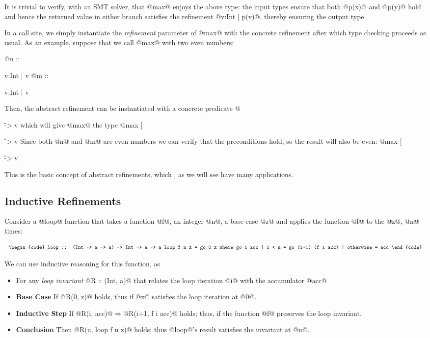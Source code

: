 It is trivial to verify, with an SMT solver, that @max@ 
enjoys the above type: the input types ensure that both @p(x)@ and @p(y)@ 
hold and hence the returned value in either branch satisfies 
the refinement  @{v:Int | p(v)}@, thereby ensuring the output 
type. 

In a call site, 
we simply instantiate
the \emph{refinement} parameter of @max@ with the concrete 
refinement 
after which type checking proceeds as usual. 
%
As an example, suppose that we call @max@ with two even numbers:

@n :: {v:Int | v %
@m :: {v:Int | v %

Then, the abstract refinement can be instantiated with a concrete predicate 
@{\v -> v %
which will give @max@ the type
@max [{\v -> v %
% 
Since both @n@ and @m@ are even numbers we can verify that the
preconditions hold, so the result will also be even:
@max [{\v -> v %

This is the basic concept of abstract refinements, which , as we will see have many applications.

\subsection{Inductive Refinements}
Consider a @loop@ function that takes 
a function @f@, an integer @n@, 
a base case @z@ and applies 
the function @f@ to the @z@, @n@ times:

$$\centering
\begin{tabular}{c}
\begin{code}
loop :: (Int -> a -> a) -> Int -> a -> a
loop f n z = go 0 z
  where go i acc | i < n     = go (i+1) (f i acc)
                 | otherwise = acc 
\end{code}
\end{tabular}$$

We can use inductive reasoning for this function, as
\begin{itemize}
\item For any \textit{loop invariant} @R :: (Int, a)@
that relates the loop iteration @i@ with the accumulator @acc@
\item\textbf{Base Case} If @R(0, z)@ holds, thus if @z@ satisfies the
loop iteration at @0@.
\item\textbf{Inductive Step} If @R(i, acc)@$\Rightarrow$@R(i+1, f i acc)@ holds; 
thus, if the function @f@ preserves the loop invariant.
\item\textbf{Conclusion} Then @R(n, loop f n z)@ holds; thus @loop@'s result 
satisfies the invariant at @n@.
\end{itemize}

}}}}}
